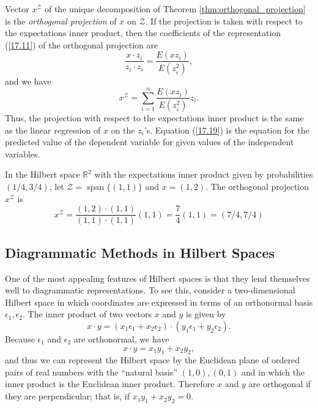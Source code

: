 \documentclass[\topdir/lecture\_notes.tex]{subfiles}
\begin{document}
Vector $x^{\mathcal{Z}}$ of the unique decomposition of Theorem \ref{thm:orthogonal_projection} is the \emph{orthogonal projection} of $x$ on $\mathcal{Z}$. If the projection is taken with respect to the expectations inner product, then the coefficients of the representation (\ref{17.11}) of the orthogonal projection are
\begin{equation*}
\frac{x \cdot z_{i}}{z_{i} \cdot z_{i}}=\frac{E(x z_{i})}{E(z_{i}^{2})}, 
\end{equation*}
and we have
\begin{equation}
x^{\mathcal{Z}}=\sum_{i=1}^{n} \frac{E(x z_{i})}{E(z_{i}^{2})} z_{i}. \label{17.19}
\end{equation}
Thus, the projection with respect to the expectations inner product is the same as the linear regression of $x$ on the $z_{i}$'s. Equation (\ref{17.19}) is the equation for the predicted value of the dependent variable for given values of the independent variables.
\begin{example}\label{ex:hilbert_projection_example}
In the Hilbert space $\mathbb{R}^{2}$ with the expectations inner product given by probabilities $(1/4, 3/4)$, let $\mathcal{Z}=\operatorname{span}\{(1,1)\}$ and $x=(1,2)$. The orthogonal projection $x^{\mathcal{Z}}$ is
\begin{equation*}
x^{\mathcal{Z}}=\frac{(1,2) \cdot(1,1)}{(1,1) \cdot(1,1)}(1,1)=\frac{7}{4}(1,1)=(7/4, 7/4) 
\end{equation*}
\end{example}
\subsection{Diagrammatic Methods in Hilbert Spaces}
One of the most appealing features of Hilbert spaces is that they lend themselves well to diagrammatic representations. To see this, consider a two-dimensional Hilbert space in which coordinates are expressed in terms of an orthonormal basis $\epsilon_{1}, \epsilon_{2}$. The inner product of two vectors $x$ and $y$ is given by
\begin{equation*}
x \cdot y=\left(x_{1} \epsilon_{1}+x_{2} \epsilon_{2}\right) \cdot\left(y_{1} \epsilon_{1}+y_{2} \epsilon_{2}\right). 
\end{equation*}
Because $\epsilon_{1}$ and $\epsilon_{2}$ are orthonormal, we have
\begin{equation*}
x \cdot y=x_{1} y_{1}+x_{2} y_{2}, 
\end{equation*}
and thus we can represent the Hilbert space by the Euclidean plane of ordered pairs of real numbers with the ``natural basis'' $(1,0),(0,1)$ and in which the inner product is the Euclidean inner product. Therefore $x$ and $y$ are orthogonal if they are perpendicular; that is, if $x_{1} y_{1}+x_{2} y_{2}=0$.
\end{document}
